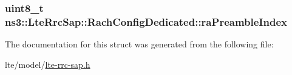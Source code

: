 \subsubsection[{\texorpdfstring{ra\+Preamble\+Index}{raPreambleIndex}}]{\setlength{\rightskip}{0pt plus 5cm}uint8\+\_\+t ns3\+::\+Lte\+Rrc\+Sap\+::\+Rach\+Config\+Dedicated\+::ra\+Preamble\+Index}\hypertarget{structns3_1_1LteRrcSap_1_1RachConfigDedicated_aa5ca0ba69db290c985fd26a87b44ee5e}{}\label{structns3_1_1LteRrcSap_1_1RachConfigDedicated_aa5ca0ba69db290c985fd26a87b44ee5e}


The documentation for this struct was generated from the following file\+:\begin{DoxyCompactItemize}
\item 
lte/model/\hyperlink{lte-rrc-sap_8h}{lte-\/rrc-\/sap.\+h}\end{DoxyCompactItemize}
